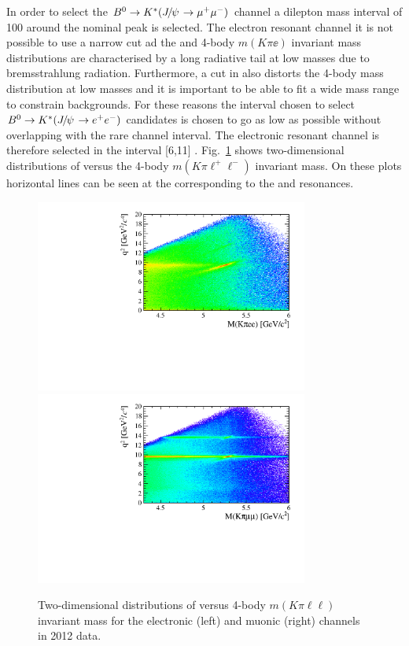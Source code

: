 In order to select the $\Bz \to\Kstar(\jpsi\to \mumu)$ channel a dilepton mass interval of 100 \mevcc
around the nominal \jpsi peak \cite{PDG2014} is selected. The electron resonant channel it is not possible
to use a narrow cut ad the \qsq and 4-body $m(K\pi\ee)$ invariant mass distributions are characterised
by a long radiative tail at low masses due to bremsstrahlung radiation. Furthermore, a cut in \qsq also
distorts the 4-body mass distribution at low masses and it is important to be able to fit a 
wide mass range to constrain backgrounds. For these reasons the interval chosen to select
$\Bz \to\Kstar(\jpsi\to \ee)$ candidates is chosen to go as low as possible without overlapping with
the rare channel interval. The electronic resonant channel is therefore selected in the interval
[6,11] \gevgevcccc. Fig.~\ref{fig:2D_q2_B0mass} shows two-dimensional distributions
of \qsq versus the 4-body $m(K\pi\ell^+\ell^-)$ invariant mass. On these plots horizontal lines can
be seen at the \qsq corresponding to the \jpsi and \psitwos resonances.

\begin{figure}[t!]
\label{fig:2D_q2_B0mass}
\centering 
\includegraphics[width=0.8\textwidth]{RKst/figs/electron_B0jpsi2D.pdf}
\includegraphics[width=0.8\textwidth]{RKst/figs/muon_B0jpsi2D.pdf}
\caption{Two-dimensional distributions of \qsq versus 4-body $m(K\pi\ell\ell)$
invariant mass for the electronic (left) and muonic (right) channels in 2012 data.}
\end{figure}



